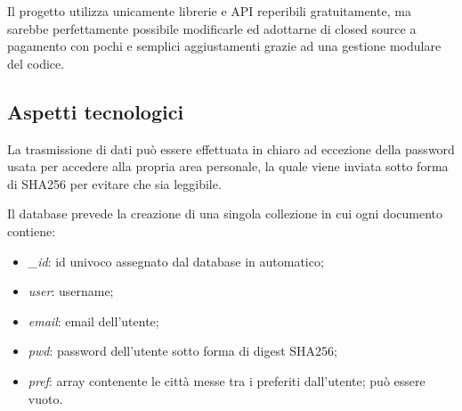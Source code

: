 \vspace{5mm}

Il progetto utilizza unicamente librerie e API reperibili gratuitamente, ma sarebbe perfettamente possibile modificarle ed
adottarne di closed source a pagamento con pochi e semplici aggiustamenti grazie ad una gestione modulare del codice.

\subsection{Aspetti tecnologici}

La trasmissione di dati può essere effettuata in chiaro ad eccezione della password usata per accedere alla propria area
personale, la quale viene inviata sotto forma di SHA256 per evitare che sia leggibile.

\vspace{5mm}

Il database prevede la creazione di una singola collezione in cui ogni documento contiene:
\begin{itemize}
    \item \emph{\_id}: id univoco assegnato dal database in automatico;
    \item \emph{user}: username;
    \item \emph{email}: email dell'utente;
    \item \emph{pwd}: password dell'utente sotto forma di digest SHA256;
    \item \emph{pref}: array contenente le città messe tra i preferiti dall'utente; può essere vuoto.
\end{itemize}

\vspace{5mm}

